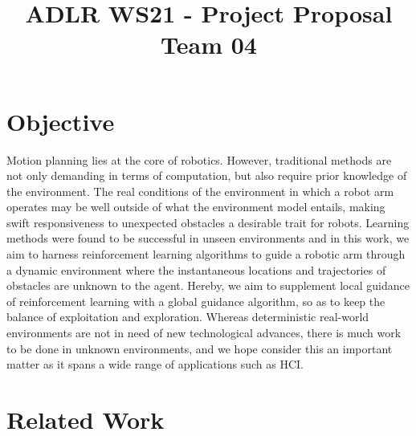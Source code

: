 \documentclass[conference]{IEEEtran}
\begin{document}
\title{ADLR WS21 - Project Proposal Team 04\\
}

\author{
\and
{}
}

\maketitle

\section{Objective}
Motion planning lies at the core of robotics. However, traditional methods are not only demanding in terms of computation, but also require prior knowledge of the environment. The real conditions of the environment in which a robot arm operates may be well outside of what the environment model entails, making swift responsiveness to unexpected obstacles a desirable trait for robots. Learning methods were found to be successful in unseen environments and in this work, we aim to harness reinforcement learning algorithms to guide a robotic arm through a dynamic environment where the instantaneous locations and trajectories of obstacles are unknown to the agent. Hereby, we aim to supplement local guidance of reinforcement learning with a global guidance algorithm, so as to keep the balance of exploitation and exploration. Whereas deterministic real-world environments are not in need of new technological advances, there is much work to be done in unknown environments, and we hope consider this an important matter as it spans a wide range of applications such as HCI.

\section{Related Work}
\end{document}
